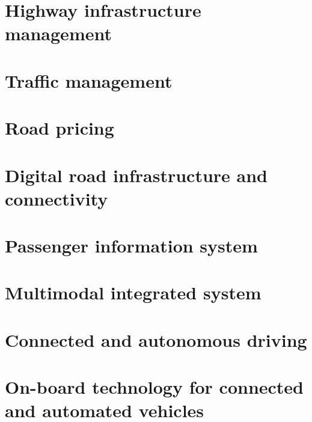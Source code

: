 \documentclass[
]{book}
\begin{document}
\hypertarget{highway-infrastructure-management}{%
\chapter{Highway infrastructure management}\label{highway-infrastructure-management}}

\hypertarget{traffic-management}{%
\chapter{Traffic management}\label{traffic-management}}

\hypertarget{road-pricing}{%
\chapter{Road pricing}\label{road-pricing}}

\hypertarget{digital-road-infrastructure-and-connectivity}{%
\chapter{Digital road infrastructure and connectivity}\label{digital-road-infrastructure-and-connectivity}}

\hypertarget{passenger-information-system}{%
\chapter{Passenger information system}\label{passenger-information-system}}

\hypertarget{multimodal-integrated-system}{%
\chapter{Multimodal integrated system}\label{multimodal-integrated-system}}

\hypertarget{connected-and-autonomous-driving}{%
\chapter{Connected and autonomous driving}\label{connected-and-autonomous-driving}}

\hypertarget{on-board-technology-for-connected-and-automated-vehicles}{%
\chapter{On-board technology for connected and automated vehicles}\label{on-board-technology-for-connected-and-automated-vehicles}}
\end{document}
